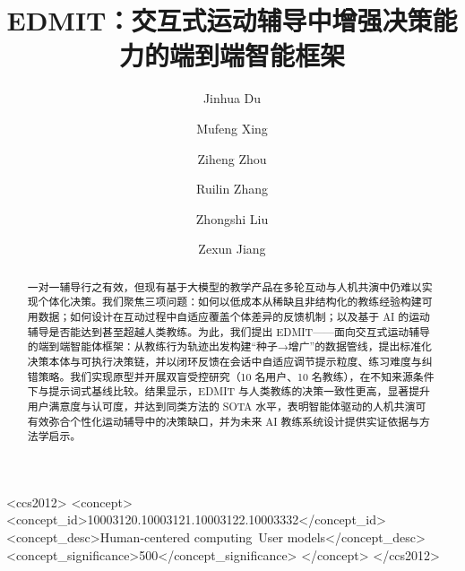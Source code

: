 \documentclass[sigconf]{acmart}
\begin{document}
\title{EDMIT：交互式运动辅导中增强决策能力的端到端智能框架}

\author{Jinhua Du}


\author{Mufeng Xing}
\author{Ziheng Zhou}
\author{Ruilin Zhang}
\author{Zhongshi Liu}

\author{Zexun Jiang}


\begin{abstract}
一对一辅导行之有效，但现有基于大模型的教学产品在多轮互动与人机共演中仍难以实现个体化决策。我们聚焦三项问题：如何以低成本从稀缺且非结构化的教练经验构建可用数据；如何设计在互动过程中自适应覆盖个体差异的反馈机制；以及基于 AI 的运动辅导是否能达到甚至超越人类教练。为此，我们提出 EDMIT——面向交互式运动辅导的端到端智能体框架：从教练行为轨迹出发构建“种子→增广”的数据管线，提出标准化决策本体与可执行决策链，并以闭环反馈在会话中自适应调节提示粒度、练习难度与纠错策略。我们实现原型并开展双盲受控研究（10 名用户、10 名教练），在不知来源条件下与提示词式基线比较。结果显示，EDMIT 与人类教练的决策一致性更高，显著提升用户满意度与认可度，并达到同类方法的 SOTA 水平，表明智能体驱动的人机共演可有效弥合个性化运动辅导中的决策缺口，并为未来 AI 教练系统设计提供实证依据与方法学启示。
\end{abstract}

\begin{CCSXML}
  <ccs2012>
  <concept>
  <concept_id>10003120.10003121.10003122.10003332</concept_id>
  <concept_desc>Human-centered computing~User models</concept_desc>
  <concept_significance>500</concept_significance>
  </concept>
  </ccs2012>
\end{CCSXML}
\end{document}
